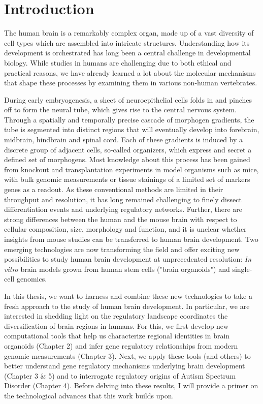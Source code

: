 \thispagestyle{plain}
\section{Introduction}




The human brain is a remarkably complex organ, made up of a vast diversity of cell types which are assembled into intricate structures. Understanding how its development is orchestrated has long been a central challenge in developmental biology. While studies in humans are challenging due to both ethical and practical reasons, we have already learned a lot about the molecular mechanisms that shape these processes by examining them in various non-human vertebrates.

During early embryogenesis, a sheet of neuroepithelial cells folds in and pinches off to form the neural tube, which gives rise to the central nervous system. Through a spatially and temporally precise cascade of morphogen gradients, the tube is segmented into distinct regions that will eventually develop into forebrain, midbrain, hindbrain and spinal cord. Each of these gradients is induced by a discrete group of adjacent cells, so-called organizers, which express and secret a defined set of morphogens. Most knowledge about this process has been gained from knockout and transplantation experiments in model organisms such as mice, with bulk genomic measurements or tissue stainings of a limited set of markers genes as a readout. As these conventional methods are limited in their throughput and resolution, it has long remained challenging to finely dissect differentiation events and underlying regulatory networks. Further, there are strong differences between the human and the mouse brain with respect to cellular composition, size, morphology and function, and it is unclear whether insights from mouse studies can be transferred to human brain development. Two emerging technologies are now transforming the field and offer exciting new possibilities to study human brain development at unprecedented resolution: ​\textit{In vitro} brain models grown from human stem cells ("brain organoids") and single-cell genomics.

In this thesis, we want to harness and combine these new technologies to take a fresh approach to the study of human brain development. In particular, we are interested in shedding light on the regulatory landscape coordinates the diversification of brain regions in humans. For this, we first develop new computational tools that help us characterize regional identities in brain organoids (Chapter 2) and infer gene regulatory relationships from modern genomic measurements (Chapter 3). Next, we apply these tools (and others) to better understand gene regulatory mechanisms underlying brain development (Chapter 3 \& 5) and to interrogate regulatory origins of Autism Spectrum Disorder (Chapter 4). Before delving into these results, I will provide a primer on the technological advances that this work builds upon.

